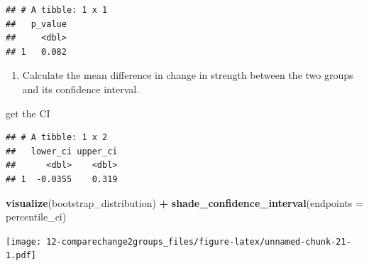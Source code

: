 \documentclass[
]{book}
\newenvironment{Shaded}{\begin{snugshade}}{\end{snugshade}}
\newcommand{\CommentTok}[1]{\textcolor[rgb]{0.56,0.35,0.01}{\textit{#1}}}
\newcommand{\DataTypeTok}[1]{\textcolor[rgb]{0.13,0.29,0.53}{#1}}
\newcommand{\DecValTok}[1]{\textcolor[rgb]{0.00,0.00,0.81}{#1}}
\newcommand{\FloatTok}[1]{\textcolor[rgb]{0.00,0.00,0.81}{#1}}
\newcommand{\KeywordTok}[1]{\textcolor[rgb]{0.13,0.29,0.53}{\textbf{#1}}}
\newcommand{\NormalTok}[1]{#1}
\newcommand{\OperatorTok}[1]{\textcolor[rgb]{0.81,0.36,0.00}{\textbf{#1}}}
\newcommand{\StringTok}[1]{\textcolor[rgb]{0.31,0.60,0.02}{#1}}
\providecommand{\tightlist}{%
  \setlength{\itemsep}{0pt}\setlength{\parskip}{0pt}}
\begin{document}
\begin{verbatim}
## # A tibble: 1 x 1
##   p_value
##     <dbl>
## 1   0.082
\end{verbatim}

\begin{enumerate}
\def\labelenumi{\arabic{enumi}.}
\setcounter{enumi}{3}
\tightlist
\item
  Calculate the mean difference in change in strength between the two groups and its confidence interval.
\end{enumerate}

\begin{Shaded}
\end{Shaded}

get the CI

\begin{Shaded}
\end{Shaded}

\begin{verbatim}
## # A tibble: 1 x 2
##   lower_ci upper_ci
##      <dbl>    <dbl>
## 1  -0.0355    0.319
\end{verbatim}

\begin{Shaded}
\begin{Highlighting}[]
\KeywordTok{visualize}\NormalTok{(bootstrap_distribution) }\OperatorTok{+}\StringTok{ }
\StringTok{  }\KeywordTok{shade_confidence_interval}\NormalTok{(}\DataTypeTok{endpoints =}\NormalTok{ percentile_ci)}
\end{Highlighting}
\end{Shaded}

\texttt{[image: 12-comparechange2groups\_files/figure-latex/unnamed-chunk-21-1.pdf]}

  
\end{document}

